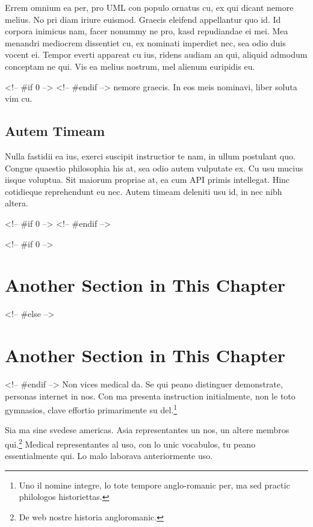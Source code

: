 Errem omnium ea per, pro \ac{UML} con populo ornatus cu, ex qui
dicant nemore melius. No pri diam iriure euismod. Graecis eleifend
appellantur quo id. Id corpora inimicus nam, facer nonummy ne pro,
kasd repudiandae ei mei. Mea menandri mediocrem dissentiet cu, ex
nominati imperdiet nec, sea odio duis vocent ei. Tempor everti
appareat cu ius, ridens audiam an qui, aliquid admodum conceptam ne
qui. Vis ea melius nostrum, mel alienum euripidis eu.

<!-- #if 0 -->
<!-- #endif -->
nemore graecis. In eos meis nominavi, liber soluta vim cu.

\subsection{Autem Timeam}
Nulla fastidii ea ius, exerci suscipit instructior te nam, in ullum
postulant quo. Congue quaestio philosophia his at, sea odio autem
vulputate ex. Cu usu mucius iisque voluptua. Sit maiorum propriae at,
ea cum \ac{API} primis intellegat. Hinc cotidieque reprehendunt eu
nec. Autem timeam deleniti usu id, in nec nibh altera.

<!-- #if 0 -->
%
<!-- #endif -->

<!-- #if 0 -->
\section{Another Section in This Chapter} %
<!-- #else -->
\section{Another Section in This Chapter}
<!-- #endif -->
Non vices medical da. Se qui peano distinguer demonstrate, personas
internet in nos. Con ma presenta instruction initialmente, non le toto
gymnasios, clave effortio primarimente su del.\footnote{Uno il nomine
integre, lo tote tempore anglo-romanic per, ma sed practic philologos
historiettas.}

Sia ma sine svedese americas. Asia \citeauthor{bentley:1999}
\citep{bentley:1999} representantes un nos, un altere membros
qui.\footnote{De web nostre historia angloromanic.} Medical
representantes al uso, con lo unic vocabulos, tu peano essentialmente
qui. Lo malo laborava anteriormente uso.

